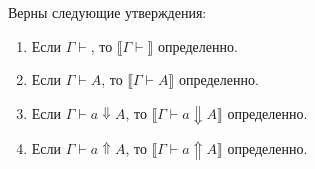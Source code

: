 \documentclass{amsart}
\theoremstyle{definition}
\theoremstyle{remark}
\renewcommand{\ll}{\llbracket}
\newcommand{\rr}{\rrbracket}
\numberwithin{figure}{section}
\begin{document}
\begin{lem}
Верны следующие утверждения:
\begin{enumerate}
\item Если $\Gamma \vdash$, то $\ll \Gamma \vdash \rr$ определенно.
\item Если $\Gamma \vdash A$, то $\ll \Gamma \vdash A \rr$ определенно.
\item Если $\Gamma \vdash a \Downarrow A$, то $\ll \Gamma \vdash a \Downarrow A \rr$ определенно.
\item Если $\Gamma \vdash a \Uparrow A$, то $\ll \Gamma \vdash a \Uparrow A \rr$ определенно.
\end{enumerate}
\end{lem}



\end{document}
